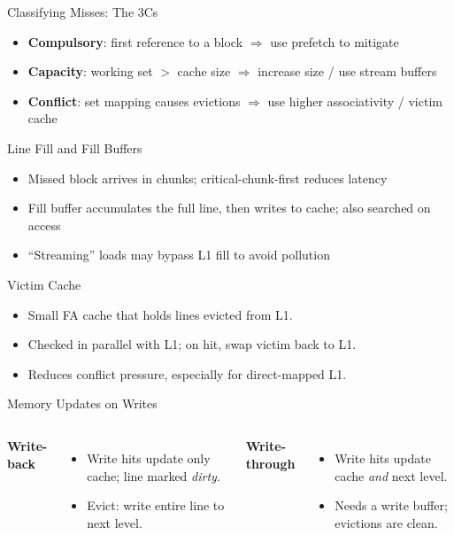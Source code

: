 \documentclass[aspectratio=169,12pt]{beamer}
\begin{document}
\begin{frame}{Classifying Misses: The 3Cs}
\begin{itemize}
  \item \textbf{Compulsory}: first reference to a block $\Rightarrow$ use prefetch to mitigate
  \item \textbf{Capacity}: working set $>$ cache size $\Rightarrow$ increase size / use stream buffers
  \item \textbf{Conflict}: set mapping causes evictions $\Rightarrow$ use higher associativity / victim cache
\end{itemize}
\end{frame}

\begin{frame}{Line Fill and Fill Buffers}
\begin{itemize}
  \item Missed block arrives in chunks; critical-chunk-first reduces latency
  \item Fill buffer accumulates the full line, then writes to cache; also searched on access
  \item ``Streaming'' loads may bypass L1 fill to avoid pollution
\end{itemize}
\end{frame}

\begin{frame}{Victim Cache}
\begin{itemize}
  \item Small FA cache that holds lines evicted from L1.
  \item Checked in parallel with L1; on hit, swap victim back to L1.
  \item Reduces conflict pressure, especially for direct-mapped L1.
\end{itemize}
\end{frame}

\begin{frame}{Memory Updates on Writes}
\begin{columns}[T]
\textbf{Write-back}
\begin{itemize}
  \item Write hits update only cache; line marked \emph{dirty}.
  \item Evict: write entire line to next level.
\end{itemize}
\textbf{Write-through}
\begin{itemize}
  \item Write hits update cache \emph{and} next level.
  \item Needs a write buffer; evictions are clean.
\end{itemize}
\end{columns}
\end{frame}
\end{document}
